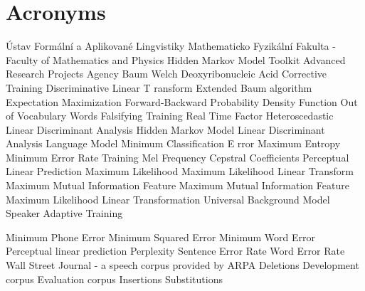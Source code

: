 \chapter{Acronyms}
\label{cha:acronyms}

\begin{acronym}[TDMA]
     {\'{U}stav Form\'{a}ln\'{i} a Aplikovan\'{e} Lingvistiky}
     {Mathematicko Fyzik\'{a}ln\'{i} Fakulta - Faculty of Mathematics and Physics}
     {Hidden Markov Model Toolkit}
     {Advanced Research Projects Agency}
     {Baum Welch}
     {Deoxyribonucleic Acid}
     {Corrective Training}
     {Discriminative Linear T ransform}
     {Extended Baum algorithm}
     {Expectation Maximization}
     {Forward-Backward}
     {Probability Density Function}
     {Out of Vocabulary Words}
     {Falsifying Training}
     {Real Time Factor}
     {Heteroscedastic Linear Discriminant Analysis}
     {Hidden Markov Model}
     {Linear Discriminant Analysis}
     {Language Model}
     {Minimum Classification E rror}
     {Maximum Entropy}
     {Minimum Error Rate Training}
     {Mel Frequency Cepstral Coefficients}
     {Perceptual Linear Prediction}
     {Maximum Likelihood}
     {Maximum Likelihood Linear Transform}
     {Maximum Mutual Information}
     {Feature Maximum Mutual Information}
     {Feature Maximum Likelihood Linear Transformation}
     {Universal Background Model}
     {Speaker Adaptive Training}

     {Minimum Phone Error}
     {Minimum Squared Error}
     {Minimum Word Error}
     {Perceptual linear prediction}
     {Perplexity}
     {Sentence Error Rate}
     {Word Error Rate}
     {Wall Street Journal - a speech corpus provided by ARPA}
     {Deletions}
     {Development corpus}
     {Evaluation corpus}
     {Insertions}
     {Substitutions}
\end{acronym}

